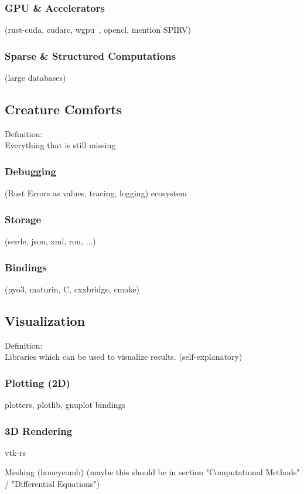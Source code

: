 \documentclass{article}
\begin{document}
\subsubsection{GPU \& Accelerators}
(rust-cuda, cudarc, wgpu~\cite{Fitzgerald2025}, opencl, mention SPIRV)

\subsubsection{Sparse \& Structured Computations}
(large databases)

\subsection{Creature Comforts}
Definition:\\
Everything that is still missing

\subsubsection{Debugging}
(Rust Errors as values, tracing, logging) ecosystem

\subsubsection{Storage}
(serde, json, xml, ron, ...)

\subsubsection{Bindings}
(pyo3, maturin, C, cxxbridge, cmake)

\subsection{Visualization}
Definition:\\
Libraries which can be used to visualize results. (self-explanatory)

\subsubsection{Plotting (2D)}
plotters, plotlib, gnuplot bindings

\subsubsection{3D Rendering}
vtk-rs

Meshing (honeycomb) (maybe this should be in section "Computational Methods" / "Differential
Equations")
\end{document}
